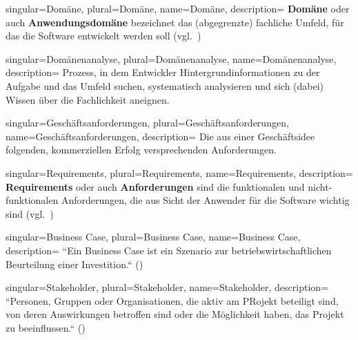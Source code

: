 {
singular={Domäne},
plural={Domäne},
name={Domäne},
description={
\textbf{Domäne} oder auch \textbf{Anwendungsdomäne} bezeichnet das (abgegrenzte) fachliche Umfeld, für das die Software entwickelt werden soll (vgl.~\cite[41]{Wed09})
}
}

{
singular={Domänenanalyse},
plural={Domänenanalyse},
name={Domänenanalyse},
description={
Prozess, in dem Entwickler Hintergrundinformationen zu der Aufgabe und das Umfeld suchen, systematisch analysieren und sich (dabei) Wissen über die Fachlichkeit aneignen.
}
}

{
singular={Geschäftsanforderungen},
plural={Geschäftsanforderungen},
name={Geschäftsanforderungen},
description={
Die aus einer Geschäftsidee folgenden, kommerziellen Erfolg versprechenden Anforderungen.
}
}

{
singular={Requirements},
plural={Requirements},
name={Requirements},
description={
\textbf{Requirements} oder auch \textbf{Anforderungen} sind die funktionalen und nicht-funktionalen Anforderungen, die aus Sicht der Anwender für die Software wichtig sind  (vgl.~\cite[41]{Wed09})
}
}

{
singular={Business Case},
plural={Business Case},
name={Business Case},
description={
``Ein Business Case ist ein Szenario zur betriebswirtschaftlichen Beurteilung einer Investition.`` (\cite[11]{Brug09})
}
}

{
singular={Stakeholder},
plural={Stakeholder},
name={Stakeholder},
description={
``Personen, Gruppen oder Organisationen, die aktiv am PRojekt beteiligt sind, von deren Auswirkungen betroffen sind oder die Möglichkeit haben, das Projekt zu beeinflussen.`` (\cite[49]{Wed09})
}
}
